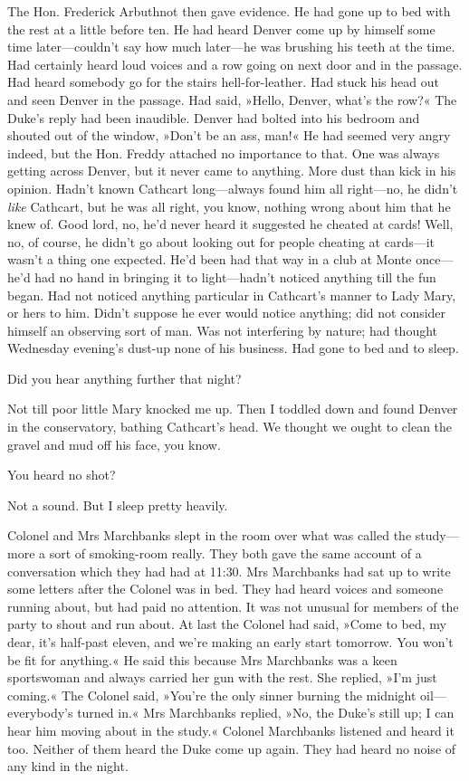 The Hon. Frederick Arbuthnot then gave evidence. He had gone up to bed with the rest at a little before ten. He had heard Denver come up by himself some time later—couldn't say how much later—he was brushing his teeth at the time.  Had certainly heard loud voices and a row going on next door and in the passage. Had heard somebody go for the stairs hell-for-leather. Had stuck his head out and seen Denver in the passage. Had said, »Hello, Denver, what's the row?« The Duke's reply had been inaudible. Denver had bolted into his bedroom and shouted out of the window, »Don't be an ass, man!« He had seemed very angry indeed, but the Hon. Freddy attached no importance to that.  One was always getting across Denver, but it never came to anything.  More dust than kick in his opinion. Hadn't known Cathcart long—always found him all right—no, he didn't \textit{like} Cathcart, but he was all right, you know, nothing wrong about him that he knew of. Good lord, no, he'd never heard it suggested he cheated at cards! Well, no, of course, he didn't go about looking out for people cheating at cards—it wasn't a thing one expected. He'd been had that way in a club at Monte once—he'd had no hand in bringing it to light—hadn't noticed anything till the fun began. Had not noticed anything particular in Cathcart's manner to Lady Mary, or hers to him. Didn't suppose he ever would notice anything; did not consider himself an observing sort of man. Was not interfering by nature; had thought Wednesday evening's dust-up none of his business. Had gone to bed and to sleep.

\begin{dialogue}

 Did you hear anything further that night?

 Not till poor little Mary knocked me up. Then I toddled down and found Denver in the conservatory, bathing Cathcart's head. We thought we ought to clean the gravel and mud off his face, you know.

 You heard no shot?

 Not a sound. But I sleep pretty heavily.
\end{dialogue}

Colonel and Mrs Marchbanks slept in the room over what was called the study—more a sort of smoking-room really. They both gave the same account of a conversation which they had had at 11:30. Mrs Marchbanks had sat up to write some letters after the Colonel was in bed. They had heard voices and someone running about, but had paid no attention.  It was not unusual for members of the party to shout and run about.  At last the Colonel had said, »Come to bed, my dear, it's half-past eleven, and we're making an early start tomorrow. You won't be fit for anything.« He said this because Mrs Marchbanks was a keen sportswoman and always carried her gun with the rest. She replied, »I'm just coming.« The Colonel said, »You're the only sinner burning the midnight oil—everybody's turned in.« Mrs Marchbanks replied, »No, the Duke's still up; I can hear him moving about in the study.« Colonel Marchbanks listened and heard it too. Neither of them heard the Duke come up again. They had heard no noise of any kind in the night.

